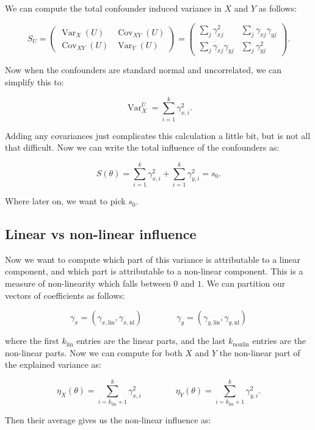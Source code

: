 \documentclass{article}
\begin{document}
We can compute the total confounder induced variance in $X$ and $Y$ as follows: 

\[
S_U =
\begin{pmatrix}
\operatorname{Var}_X(U) & \operatorname{Cov}_{XY}(U) \\
\operatorname{Cov}_{XY}(U) & \operatorname{Var}_Y(U)
\end{pmatrix}
=
\begin{pmatrix}
\sum_j \gamma_{xj}^2 & \sum_j \gamma_{xj}\gamma_{yj} \\
\sum_j \gamma_{xj}\gamma_{yj} & \sum_j \gamma_{yj}^2
\end{pmatrix}.
\]

\noindent
Now when the confounders are standard normal and uncorrelated, we can simplify this to:

\[
\operatorname{Var}_X^U = \sum_{i=1}^{k} \gamma_{x,i}^2.
\]

\noindent
Adding any covariances just complicates this calculation a little bit, but is not all that difficult. Now we can write the total influence of the 
confounders as:

\[
S(\theta) = \sum_{i=1}^{k} \gamma_{x,i}^2 + \sum_{i=1}^{k} \gamma_{y,i}^2 = s_0.
\]

\noindent
Where later on, we want to pick $s_0$. 

\subsection*{Linear vs non-linear influence}
Now we want to compute which part of this variance is attributable to a linear component, and which part is attributable to a non-linear component.
This is a measure of non-linearity which falls between $0$ and $1$. We can partition our vectors of coefficients as follows:

\[
\gamma_x = (\gamma_{x,\text{lin}}, \gamma_{x,\text{nl}}) \qquad\qquad 
\gamma_y = (\gamma_{y,\text{lin}}, \gamma_{y,\text{nl}})
\]

\noindent
where the first $k_{\text{lin}}$ entries are the linear parts, and the last $k_{\text{nonlin}}$ entries are the non-linear parts. Now we can compute for both
$X$ and $Y$ the non-linear part of the explained variance as:

\[
\eta_X(\theta)= \sum_{i=k_{\text{lin}}+1}^{k} \gamma_{x,i}^2 \qquad\qquad 
\eta_Y(\theta) = \sum_{i=k_{\text{lin}}+1}^{k} \gamma_{y,i}^2.
\]

\noindent
Then their average gives us the non-linear influence as:
\end{document}
